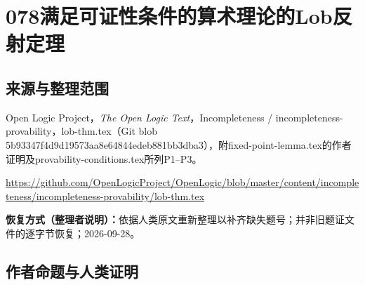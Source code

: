 \documentclass[UTF8,11pt]{ctexart}
\theoremstyle{definition}
\begin{document}
\section*{078\quad 满足可证性条件的算术理论的Lob反射定理}
\subsection*{来源与整理范围}
Open Logic Project，\emph{The Open Logic Text}，Incompleteness / incompleteness-provability，lob-thm.tex（Git blob 5b93347f4d9d19573aa8e64844edeb881bb3dba3），附fixed-point-lemma.tex的作者证明及provability-conditions.tex所列P1--P3。
\par\url{https://github.com/OpenLogicProject/OpenLogic/blob/master/content/incompleteness/incompleteness-provability/lob-thm.tex}
\par\textbf{恢复方式（整理者说明）：}依据人类原文重新整理以补齐缺失题号；并非旧题证文件的逐字节恢复；2026-09-28。
\subsection*{作者命题与人类证明}
\end{document}
